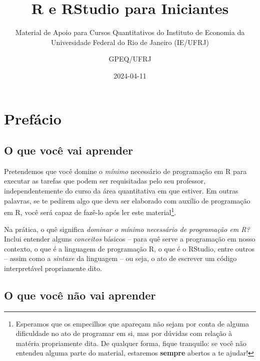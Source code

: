 \documentclass[
  letterpaper,
  DIV=11,
  numbers=noendperiod]{scrreprt}
\title{R e RStudio para Iniciantes}
\subtitle{Material de Apoio para Cursos Quantitativos do Instituto de
Economia da Universidade Federal do Rio de Janeiro (IE/UFRJ)}
\author{GPEQ/UFRJ}
\date{2024-04-11}
\renewcommand*\contentsname{Índice}
\newcommand\contentsname{Índice}
\begin{document}
\maketitle

\renewcommand*\contentsname{Índice}
{
\hypersetup{linkcolor=}
\setcounter{tocdepth}{2}
\tableofcontents
}

\chapter*{Prefácio}\label{sec-preface}


\section*{O que você vai aprender}\label{o-que-vocuxea-vai-aprender}


Pretendemos que você domine o \emph{mínimo} necessário de programação em
R para executar as tarefas que podem ser requisitadas pelo seu
professor, independentemente do curso da área quantitativa em que
estiver. Em outras palavras, se te pedirem algo que deva ser elaborado
com auxílio de programação em R, você será capaz de fazê-lo após ler
este material\footnote{Esperamos que os empecilhos que apareçam não
  sejam por conta de alguma dificuldade no ato de programar em si, mas
  por dúvidas com relação à matéria propriamente dita. De qualquer
  forma, fique tranquilo: se você não entendeu alguma parte do material,
  estaremos \textbf{sempre} abertos a te ajudar!}.

Na prática, o quê significa \emph{dominar o mínimo necessário de
programação em R?} Inclui entender alguns \emph{conceitos} básicos --
para quê serve a programação em nosso contexto, o que é a linguagem de
programação R, o que é o RStudio, entre outros -- assim como a
\emph{sintaxe} da linguagem -- ou seja, o ato de escrever um código
interpretável propriamente dito.

\section*{\texorpdfstring{O que você \textbf{não} vai
aprender}{O que você não vai aprender}}\label{o-que-vocuxea-nuxe3o-vai-aprender}
\end{document}
